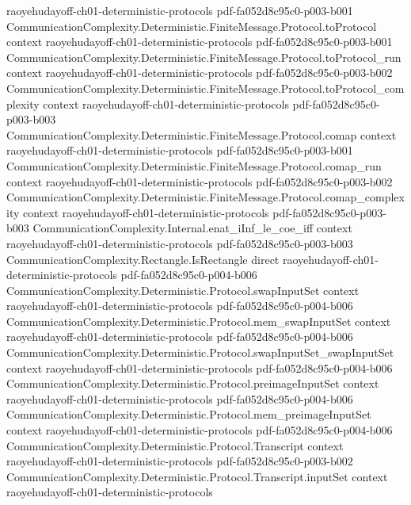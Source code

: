 \begin{theorem}
  {raoyehudayoff-ch01-deterministic-protocols}
  {pdf-fa052d8c95c0-p003-b001}
\proofstep
  {CommunicationComplexity.Deterministic.FiniteMessage.Protocol.toProtocol}
  {context}
  {raoyehudayoff-ch01-deterministic-protocols}
  {pdf-fa052d8c95c0-p003-b001}
\proofstep
  {CommunicationComplexity.Deterministic.FiniteMessage.Protocol.toProtocol_run}
  {context}
  {raoyehudayoff-ch01-deterministic-protocols}
  {pdf-fa052d8c95c0-p003-b002}
\proofstep
  {CommunicationComplexity.Deterministic.FiniteMessage.Protocol.toProtocol_complexity}
  {context}
  {raoyehudayoff-ch01-deterministic-protocols}
  {pdf-fa052d8c95c0-p003-b003}
\proofstep
  {CommunicationComplexity.Deterministic.FiniteMessage.Protocol.comap}
  {context}
  {raoyehudayoff-ch01-deterministic-protocols}
  {pdf-fa052d8c95c0-p003-b001}
\proofstep
  {CommunicationComplexity.Deterministic.FiniteMessage.Protocol.comap_run}
  {context}
  {raoyehudayoff-ch01-deterministic-protocols}
  {pdf-fa052d8c95c0-p003-b002}
\proofstep
  {CommunicationComplexity.Deterministic.FiniteMessage.Protocol.comap_complexity}
  {context}
  {raoyehudayoff-ch01-deterministic-protocols}
  {pdf-fa052d8c95c0-p003-b003}
\proofstep
  {CommunicationComplexity.Internal.enat_iInf_le_coe_iff}
  {context}
  {raoyehudayoff-ch01-deterministic-protocols}
  {pdf-fa052d8c95c0-p003-b003}
\proofstep
  {CommunicationComplexity.Rectangle.IsRectangle}
  {direct}
  {raoyehudayoff-ch01-deterministic-protocols}
  {pdf-fa052d8c95c0-p004-b006}
\proofstep
  {CommunicationComplexity.Deterministic.Protocol.swapInputSet}
  {context}
  {raoyehudayoff-ch01-deterministic-protocols}
  {pdf-fa052d8c95c0-p004-b006}
\proofstep
  {CommunicationComplexity.Deterministic.Protocol.mem_swapInputSet}
  {context}
  {raoyehudayoff-ch01-deterministic-protocols}
  {pdf-fa052d8c95c0-p004-b006}
\proofstep
  {CommunicationComplexity.Deterministic.Protocol.swapInputSet_swapInputSet}
  {context}
  {raoyehudayoff-ch01-deterministic-protocols}
  {pdf-fa052d8c95c0-p004-b006}
\proofstep
  {CommunicationComplexity.Deterministic.Protocol.preimageInputSet}
  {context}
  {raoyehudayoff-ch01-deterministic-protocols}
  {pdf-fa052d8c95c0-p004-b006}
\proofstep
  {CommunicationComplexity.Deterministic.Protocol.mem_preimageInputSet}
  {context}
  {raoyehudayoff-ch01-deterministic-protocols}
  {pdf-fa052d8c95c0-p004-b006}
\proofstep
  {CommunicationComplexity.Deterministic.Protocol.Transcript}
  {context}
  {raoyehudayoff-ch01-deterministic-protocols}
  {pdf-fa052d8c95c0-p003-b002}
\proofstep
  {CommunicationComplexity.Deterministic.Protocol.Transcript.inputSet}
  {context}
  {raoyehudayoff-ch01-deterministic-protocols}

\end{theorem}
